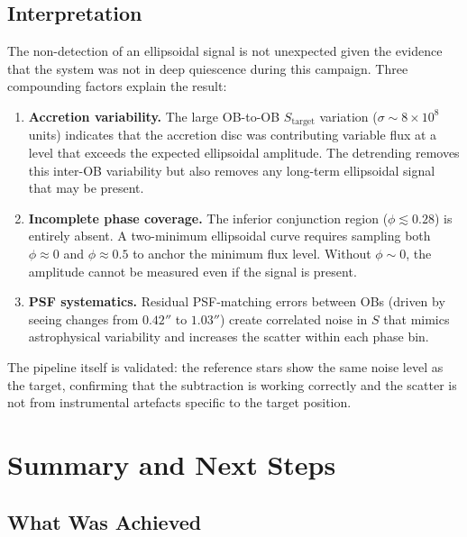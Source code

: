 \documentclass[12pt,a4paper]{article}
\begin{document}
\subsection{Interpretation}
The non-detection of an ellipsoidal signal is not unexpected given the
evidence that the system was not in deep quiescence during this campaign.
Three compounding factors explain the result:

\begin{enumerate}
  \item \textbf{Accretion variability.}  The large OB-to-OB $S_\mathrm{target}$
        variation ($\sigma \sim 8 \times 10^8$ units) indicates that the
        accretion disc was contributing variable flux at a level that
        exceeds the expected ellipsoidal amplitude.  The detrending removes
        this inter-OB variability but also removes any long-term ellipsoidal
        signal that may be present.

  \item \textbf{Incomplete phase coverage.}  The inferior conjunction region
        ($\phi \lesssim 0.28$) is entirely absent.  A two-minimum ellipsoidal
        curve requires sampling both $\phi \approx 0$ and $\phi \approx 0.5$
        to anchor the minimum flux level.  Without $\phi \sim 0$, the
        amplitude cannot be measured even if the signal is present.

  \item \textbf{PSF systematics.}  Residual PSF-matching errors between OBs
        (driven by seeing changes from $0.42''$ to $1.03''$) create
        correlated noise in $S$ that mimics astrophysical variability and
        increases the scatter within each phase bin.
\end{enumerate}

The pipeline itself is validated: the reference stars show the same noise
level as the target, confirming that the subtraction is working correctly
and the scatter is not from instrumental artefacts specific to the target
position.

\section{Summary and Next Steps}

\subsection{What Was Achieved}
\end{document}
